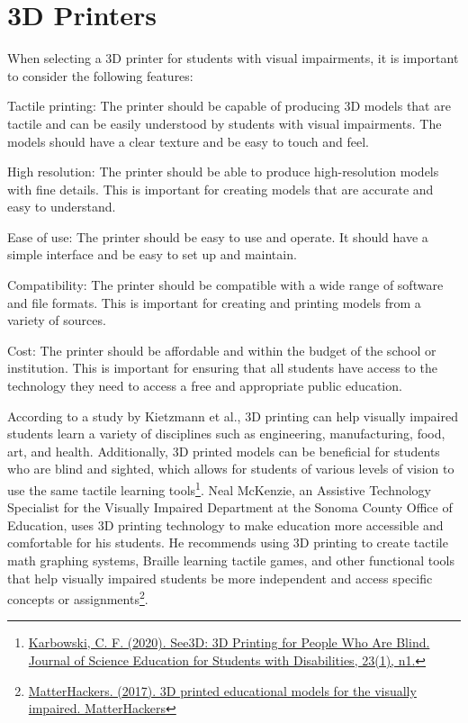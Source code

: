 \pagebreak \hypertarget{d-print-equipment}{}\section{3D Printers}\label{d-print-equipment}
When selecting a 3D printer for students with visual impairments, it is important to consider the following features:

Tactile printing: The printer should be capable of producing 3D models that are tactile and can be easily understood by students with visual impairments. The models should have a clear texture and be easy to touch and feel.

High resolution: The printer should be able to produce high-resolution models with fine details. This is important for creating models that are accurate and easy to understand.

Ease of use: The printer should be easy to use and operate. It should have a simple interface and be easy to set up and maintain.

Compatibility: The printer should be compatible with a wide range of software and file formats. This is important for creating and printing models from a variety of sources.

Cost: The printer should be affordable and within the budget of the school or institution. This is important for ensuring that all students have access to the technology they need to access a free and appropriate public education.

According to a study by Kietzmann et al., 3D printing can help visually impaired students learn a variety of disciplines such as engineering, manufacturing, food, art, and health. Additionally, 3D printed models can be beneficial for students who are blind and sighted, which allows for students of various levels of vision to use the same tactile learning tools\footnote{\raggedright \href{http://files.eric.ed.gov/fulltext/EJ1247154.pdf}{Karbowski, C. F. (2020). See3D: 3D Printing for People Who Are Blind. Journal of Science Education for Students with Disabilities, 23(1), n1.}}. Neal McKenzie, an Assistive Technology Specialist for the Visually Impaired Department at the Sonoma County Office of Education, uses 3D printing technology to make education more accessible and comfortable for his students. He recommends using 3D printing to create tactile math graphing systems, Braille learning tactile games, and other functional tools that help visually impaired students be more independent and access specific concepts or assignments\footnote{\raggedright \href{http://www.matterhackers.com/articles/3d-printed-educational-models-for-the-visually-impaired}{MatterHackers. (2017). 3D printed educational models for the visually impaired. MatterHackers}}. 

